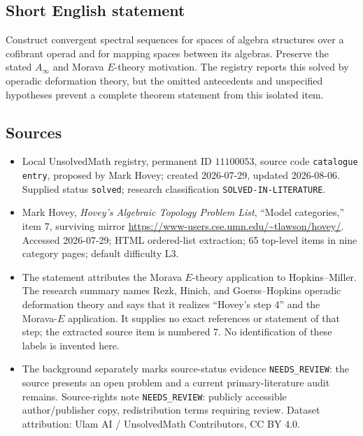 \documentclass[11pt]{article}
\begin{document}
\subsection{Short English statement}
Construct convergent spectral sequences for spaces of algebra structures over a cofibrant operad and for mapping spaces between its algebras. Preserve the stated $A_{\infty}$ and Morava $E$-theory motivation. The registry reports this solved by operadic deformation theory, but the omitted antecedents and unspecified hypotheses prevent a complete theorem statement from this isolated item.
\subsection{Sources}
\begin{itemize}
\item Local UnsolvedMath registry, permanent ID $11100053$, source code \texttt{catalogue entry}, proposed by Mark Hovey; created 2026-07-29, updated 2026-08-06. Supplied status \texttt{solved}; research classification \texttt{SOLVED-IN-LITERATURE}.
\item Mark Hovey, \emph{Hovey's Algebraic Topology Problem List}, ``Model categories,'' item 7, surviving mirror \url{https://www-users.cse.umn.edu/~tlawson/hovey/}. Accessed 2026-07-29; HTML ordered-list extraction; 65 top-level items in nine category pages; default difficulty L3.
\item The statement attributes the Morava $E$-theory application to Hopkins--Miller. The research summary names Rezk, Hinich, and Goerss--Hopkins operadic deformation theory and says that it realizes ``Hovey's step 4'' and the Morava-$E$ application. It supplies no exact references or statement of that step; the extracted source item is numbered 7. No identification of these labels is invented here.
\item The background separately marks source-status evidence \texttt{NEEDS\_REVIEW}: the source presents an open problem and a current primary-literature audit remains. Source-rights note \texttt{NEEDS\_REVIEW}: publicly accessible author/publisher copy, redistribution terms requiring review. Dataset attribution: Ulam AI / UnsolvedMath Contributors, CC BY 4.0.
\end{itemize}
\end{document}
